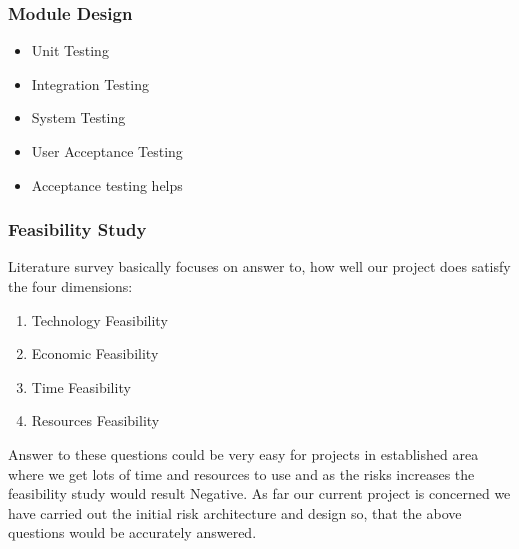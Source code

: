 \documentclass[a4paper,14pt,onecolumn]{article}
\begin{document}
\subsubsection{Module Design}
   \begin{itemize}
   \item Unit Testing
   \item Integration Testing
   \item System Testing
   \item User Acceptance Testing
   \item Acceptance testing helps
   \end{itemize}

\subsubsection{Feasibility Study}
Literature survey basically focuses on answer to, how well our project does satisfy the four dimensions:
   \begin{enumerate}
   \item Technology Feasibility
   \item Economic Feasibility
   \item Time Feasibility
   \item Resources Feasibility
   \end{enumerate}
Answer to these questions could be very easy for projects in established area where we get lots of time and resources to use and as the risks increases the feasibility study would result Negative.
As far our current project is concerned we have carried out the initial risk architecture and design so, that the above questions would be accurately answered.
\end{document}
